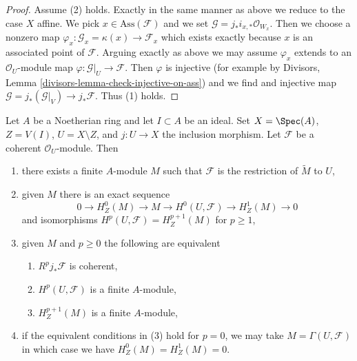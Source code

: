 \begin{proof}
\medskip\noindent
Assume (2) holds. Exactly in the same manner as above we reduce
to the case $X$ affine. We pick $x \in \text{Ass}(\mathcal{F})$
and we set $\mathcal{G} = j_*i_{x, *}\mathcal{O}_{W_x}$.
Then we choose a nonzero map
$\varphi_x : \mathcal{G}_x = \kappa(x) \to \mathcal{F}_x$
which exists exactly because $x$ is an associated point of $\mathcal{F}$.
Arguing exactly as above we may assume $\varphi_x$
extends to an $\mathcal{O}_U$-module map
$\varphi : \mathcal{G}|_U \to \mathcal{F}$.
Then $\varphi$ is injective (for example by
Divisors, Lemma \ref{divisors-lemma-check-injective-on-ass})
and we find and injective map
$\mathcal{G} = j_*(\mathcal{G}|_V) \to j_*\mathcal{F}$.
Thus (1) holds.
\end{proof}

\begin{lemma}
\label{lemma-finiteness-pushforwards-and-H1-local}
Let $A$ be a Noetherian ring and let $I \subset A$ be an ideal.
Set $X = \Spec(A)$, $Z = V(I)$, $U = X \setminus Z$, and $j : U \to X$
the inclusion morphism. Let $\mathcal{F}$ be a coherent $\mathcal{O}_U$-module.
Then
\begin{enumerate}
\item there exists a finite $A$-module $M$ such that $\mathcal{F}$ is the
restriction of $\widetilde{M}$ to $U$,
\item given $M$ there is an exact sequence
$$
0 \to H^0_Z(M) \to M \to H^0(U, \mathcal{F}) \to H^1_Z(M) \to 0
$$
and isomorphisms $H^p(U, \mathcal{F}) = H^{p + 1}_Z(M)$ for $p \geq 1$,
\item given $M$ and $p \geq 0$ the following are equivalent
\begin{enumerate}
\item $R^pj_*\mathcal{F}$ is coherent,
\item $H^p(U, \mathcal{F})$ is a finite $A$-module,
\item $H^{p + 1}_Z(M)$ is a finite $A$-module,
\end{enumerate}
\item if the equivalent conditions in (3) hold for $p = 0$, we may take
$M = \Gamma(U, \mathcal{F})$ in which case we have $H^0_Z(M) = H^1_Z(M) = 0$.
\end{enumerate}
\end{lemma}

